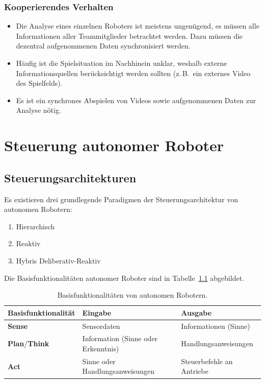 \documentclass[a4paper, 11pt, accentcolor = tud3b]{tudreport}
\newcommand{\zB}{z.\,B.~}
\begin{document}
			\subsection{Kooperierendes Verhalten}
				\begin{itemize}
					\item Die Analyse eines einzelnen Roboters ist meistens ungenügend, es müssen alle Informationen aller Teammitglieder betrachtet werden. Dazu müssen die dezentral aufgenommenen Daten synchronisiert werden.
					\item Häufig ist die Spielsituation im Nachhinein unklar, weshalb externe Informationsquellen berücksichtigt werden sollten (\zB ein externes Video des Spielfelds).
					\item Es ist ein synchrones Abspielen von Videos sowie aufgenommenen Daten zur Analyse nötig.
				\end{itemize}

	\chapter{Steuerung autonomer Roboter}
		\section{Steuerungsarchitekturen}
			Es existieren drei grundlegende Paradigmen der Steuerungsarchitektur von autonomen Robotern:
			\begin{enumerate}
				\item Hierarchisch
				\item Reaktiv
				\item Hybris Deliberativ-Reaktiv
			\end{enumerate}
			Die Basisfunktionalitäten autonomer Roboter sind in Tabelle~\ref{tab:basic_functionalities_of_autonomous_robots} abgebildet.
			
			\begin{table}
				\centering
				\begin{tabular}{l|ll}
					\textbf{Basisfunktionalität} & \textbf{Eingabe}                    & \textbf{Ausgabe}          \\ \hline
					\textbf{Sense}               & Sensordaten                         & Informationen (Sinne)     \\
					\textbf{Plan}/\textbf{Think} & Information (Sinne oder Erkenntnis) & Handlungsanweisungen      \\
					\textbf{Act}                 & Sinne oder Handlungsanweisungen     & Steuerbefehle an Antriebe
				\end{tabular}
				\caption{Basisfunktionalitäten von autonomen Robotern.}
				\label{tab:basic_functionalities_of_autonomous_robots}
			\end{table}
\end{document}
